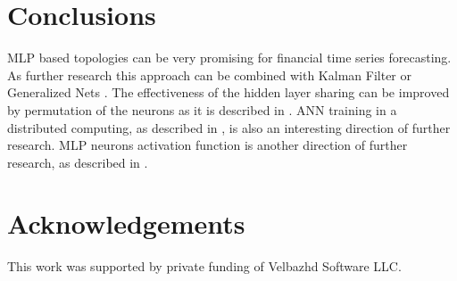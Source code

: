 \documentclass{llncs}
\begin{document}
\section{Conclusions} \label{Conclusions}

MLP based topologies can be very promising for financial time series forecasting. As further research this approach can be combined with Kalman Filter \cite{alexandrov01} or Generalized Nets \cite{tashev01,tashev02}. The effectiveness of the hidden layer sharing can be improved by permutation of the neurons as it is described in \cite{zankinski02}. ANN training in a distributed computing, as described in \cite{balabanov01,balabanov02,balabanov03,balabanov04,keremedchiev01,tomov01}, is also an interesting direction of further research. MLP neurons activation function is another direction of further research, as described in \cite{zankinski01}.


\section*{Acknowledgements}

This work was supported by private funding of Velbazhd Software LLC.

\end{document}
